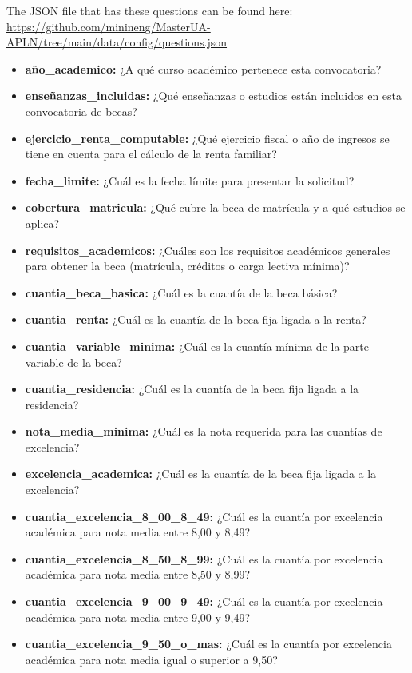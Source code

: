 \documentclass{article}
\begin{document}
The JSON file that has these questions can be found here:\\ \url{https://github.com/minineng/MasterUA-APLN/tree/main/data/config/questions.json}
\begin{itemize}
\item \textbf{año\_academico:} ¿A qué curso académico pertenece esta convocatoria?
\item \textbf{enseñanzas\_incluidas:} ¿Qué enseñanzas o estudios están incluidos en esta convocatoria de becas?
\item \textbf{ejercicio\_renta\_computable:} ¿Qué ejercicio fiscal o año de ingresos se tiene en cuenta para el cálculo de la renta familiar?
\item \textbf{fecha\_limite:} ¿Cuál es la fecha límite para presentar la solicitud?
\item \textbf{cobertura\_matricula:} ¿Qué cubre la beca de matrícula y a qué estudios se aplica?
\item \textbf{requisitos\_academicos:} ¿Cuáles son los requisitos académicos generales para obtener la beca (matrícula, créditos o carga lectiva mínima)?
\item \textbf{cuantia\_beca\_basica:} ¿Cuál es la cuantía de la beca básica?
\item \textbf{cuantia\_renta:} ¿Cuál es la cuantía de la beca fija ligada a la renta?
\item \textbf{cuantia\_variable\_minima:} ¿Cuál es la cuantía mínima de la parte variable de la beca?
\item \textbf{cuantia\_residencia:} ¿Cuál es la cuantía de la beca fija ligada a la residencia?
\item \textbf{nota\_media\_minima:} ¿Cuál es la nota requerida para las cuantías de excelencia?
\item \textbf{excelencia\_academica:} ¿Cuál es la cuantía de la beca fija ligada a la excelencia?
\item \textbf{cuantia\_excelencia\_8\_00\_8\_49:} ¿Cuál es la cuantía por excelencia académica para nota media entre 8,00 y 8,49?
\item \textbf{cuantia\_excelencia\_8\_50\_8\_99:} ¿Cuál es la cuantía por excelencia académica para nota media entre 8,50 y 8,99?
\item \textbf{cuantia\_excelencia\_9\_00\_9\_49:} ¿Cuál es la cuantía por excelencia académica para nota media entre 9,00 y 9,49?
\item \textbf{cuantia\_excelencia\_9\_50\_o\_mas:} ¿Cuál es la cuantía por excelencia académica para nota media igual o superior a 9,50?

\end{itemize}
\end{document}
